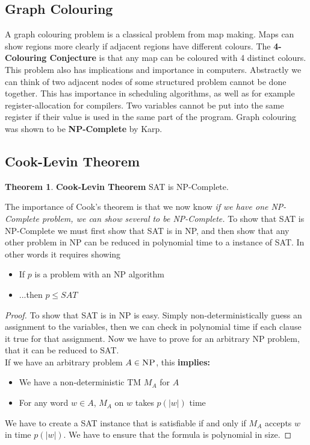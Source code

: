 \documentclass{article}
\theoremstyle{definition}
\newtheorem{theorem}{Theorem}[section]
\newcommand{\n}[0]{\\[\baselineskip]}
\begin{document}
\subsection{Graph Colouring}
A graph colouring problem is a classical problem from map making. Maps can show regions more clearly if adjacent regions have different colours. The \textbf{4-Colouring Conjecture} is that any map can be coloured with 4 distinct colours. 
\n
This problem also has implications and importance in computers. Abstractly we can think of two adjacent nodes of some structured problem cannot be done together. This has importance in scheduling algorithms, as well as for example register-allocation for compilers. Two variables cannot be put into the same register if their value is used in the same part of the program. Graph colouring was shown to be \textbf{NP-Complete} by Karp.
\n

\subsection{Cook-Levin Theorem}
\begin{theorem}{\textbf{Cook-Levin Theorem}}
SAT is NP-Complete.
\end{theorem}
\noindent
The importance of Cook's theorem is that we now know \textit{if we have one NP-Complete problem, we can show several to be NP-Complete.} To show that SAT is NP-Complete we must first show that SAT is in NP, and then show that any other problem in NP can be reduced in polynomial time to a instance of SAT. In other words it requires showing
\begin{itemize}
\item If $p$ is a problem with an NP algorithm
\item ...then $p \leq SAT$
\end{itemize}
\begin{proof}
To show that SAT is in NP is easy. Simply non-deterministically guess an assignment to the variables, then we can check in polynomial time if each clause it true for that assignment. Now we have to prove for an arbitrary NP problem, that it can be reduced to SAT. 
\n
If we have an arbitrary problem $A \in \textsc{NP}$, this \textbf{implies:}
\begin{itemize}
\item We have a non-deterministic TM $M_{A}$ for $A$
\item For any word $w \in A$, $M_{A}$ on $w$ takes $p(|w|)$ time
\end{itemize}
We have to create a SAT instance that is satisfiable if and only if $M_{A}$ accepts $w$ in time $p(|w|)$. We have to ensure that the formula is polynomial in size. 
\end{proof}
\end{document}
